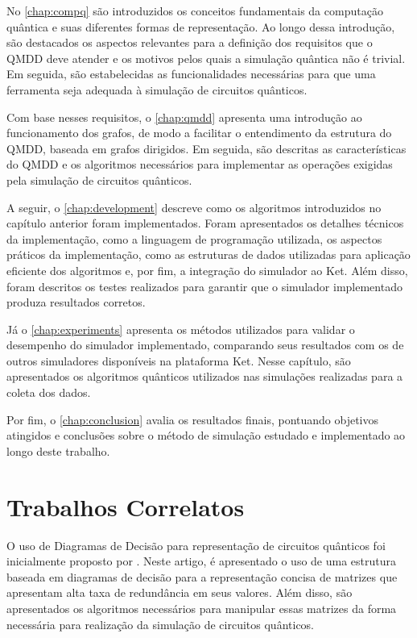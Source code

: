 No \cref{chap:compq} são introduzidos os conceitos fundamentais da computação quântica e suas diferentes formas de representação. Ao longo dessa introdução, são destacados os aspectos relevantes para a definição dos requisitos que o QMDD deve atender e os motivos pelos quais a simulação quântica não é trivial. Em seguida, são estabelecidas as funcionalidades necessárias para que uma ferramenta seja adequada à simulação de circuitos quânticos.

Com base nesses requisitos, o \cref{chap:qmdd} apresenta uma introdução ao funcionamento dos grafos, de modo a facilitar o entendimento da estrutura do QMDD, baseada em grafos dirigidos. Em seguida, são descritas as características do QMDD e os algoritmos necessários para implementar as operações exigidas pela simulação de circuitos quânticos.

A seguir, o \cref{chap:development} descreve como os algoritmos introduzidos no capítulo anterior foram implementados. Foram apresentados os detalhes técnicos da implementação, como a linguagem de programação utilizada, os aspectos práticos da implementação, como as estruturas de dados utilizadas para aplicação eficiente dos algoritmos e, por fim, a integração do simulador ao Ket. Além disso, foram descritos os testes realizados para garantir que o simulador implementado produza resultados corretos.

Já o \cref{chap:experiments} apresenta os métodos utilizados para validar o desempenho do simulador implementado, comparando seus resultados com os de outros simuladores disponíveis na plataforma Ket. Nesse capítulo, são apresentados os algoritmos quânticos utilizados nas simulações realizadas para a coleta dos dados.

Por fim, o \cref{chap:conclusion} avalia os resultados finais, pontuando objetivos atingidos e conclusões sobre o método de simulação estudado e implementado ao longo deste trabalho. 

\section{Trabalhos Correlatos}

O uso de Diagramas de Decisão para representação de circuitos quânticos foi inicialmente proposto por \cite{miller2006qmdd}. Neste artigo, é apresentado o uso de uma estrutura baseada em diagramas de decisão para a representação concisa de matrizes que apresentam alta taxa de redundância em seus valores. Além disso, são apresentados os algoritmos necessários para manipular essas matrizes da forma necessária para realização da simulação de circuitos quânticos.

